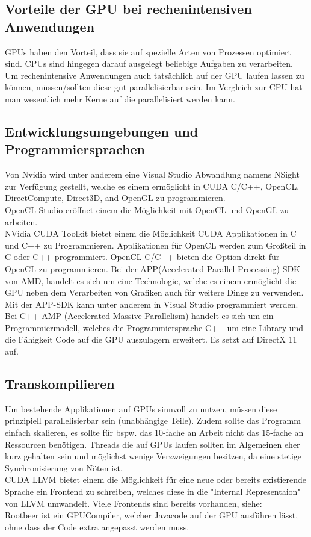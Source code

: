 \subsection{Vorteile der GPU bei rechenintensiven Anwendungen}
\label{sec:Vorteile der GPU bei rechenintensiven Anwendungen}
GPUs haben den Vorteil, dass sie auf spezielle Arten von Prozessen optimiert sind. CPUs sind hingegen darauf ausgelegt beliebige Aufgaben zu verarbeiten. Um rechenintensive Anwendungen auch tatsächlich auf der GPU laufen lassen zu können, müssen/sollten diese gut parallelisierbar sein. 
Im Vergleich zur CPU hat man wesentlich mehr Kerne auf die parallelisiert werden kann.

\subsection{Entwicklungsumgebungen und Programmiersprachen}
Von Nvidia wird unter anderem eine Visual Studio Abwandlung namens NSight zur Verfügung gestellt, welche es einem ermöglicht in CUDA C/C++, OpenCL, DirectCompute, Direct3D, and OpenGL zu programmieren.\\
OpenCL Studio eröffnet einem die Möglichkeit mit OpenCL und OpenGL zu arbeiten.\\
NVidia CUDA Toolkit bietet einem die Möglichkeit CUDA Applikationen in C und C++ zu Programmieren.
Applikationen für OpenCL werden zum Großteil in C oder C++ programmiert. OpenCL C/C++ bieten die Option direkt für OpenCL zu programmieren.
Bei der APP(Accelerated Parallel Processing) SDK von AMD, handelt es sich um eine Technologie, welche es einem ermöglicht die GPU neben dem Verarbeiten von Grafiken auch für weitere Dinge zu verwenden. Mit der APP-SDK kann unter anderem in Visual Studio programmiert werden. \cite{appsdk}\\
Bei C++ AMP (Accelerated Massive Parallelism) handelt es sich um ein Programmiermodell, welches die Programmiersprache C++  um eine Library und die Fähigkeit Code auf die GPU auszulagern erweitert.
Es setzt auf DirectX 11 auf. \cite{AMP}
\subsection{Transkompilieren}
Um bestehende Applikationen auf GPUs sinnvoll zu nutzen, müssen diese prinzipiell parallelisierbar sein (unabhängige Teile). Zudem sollte das Programm einfach skalieren, es sollte für bspw. das 10-fache an Arbeit nicht das 15-fache an Ressourcen benötigen.
Threads die auf GPUs laufen sollten im Algemeinen eher kurz gehalten sein und möglichst wenige Verzweigungen besitzen, da eine stetige Synchronisierung von Nöten ist. \cite{GPUGrundlagen}\\
CUDA LLVM bietet einem die Möglichkeit für eine neue oder bereits existierende Sprache ein Frontend zu schreiben, welches diese in die "Internal Representaion" von LLVM umwandelt. Viele Frontends sind bereits vorhanden, siehe: \cite{llvm} \cite{llvmfrontend} \\
Rootbeer ist ein GPUCompiler, welcher Javacode auf der GPU ausführen lässt, ohne dass der Code extra angepasst werden muss.\cite{Rootbeer}

